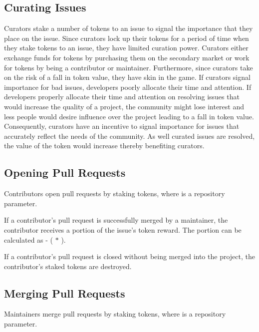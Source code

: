 \subsection{Curating Issues}

Curators stake a number of tokens to an issue to signal the importance that they
place on the issue. Since curators lock up their tokens for a period of time
when they stake tokens to an issue, they have limited curation power. Curators either exchange funds for tokens by purchasing them
on the secondary market or work for tokens by being a
contributor or maintainer. Furthermore, since curators take on the risk of a
fall in token value, they have skin in the game\cite{skininthegame}. If curators
signal importance for bad issues, developers poorly allocate their time and
attention. If developers properly allocate their time and attention on resolving
issues that would increase the quality of a project, the community might lose
interest and less people would desire influence over the project leading to a
fall in token value. Consequently, curators have an incentive to signal
importance for issues that accurately reflect the needs of the community. As
well curated issues are resolved, the value of the token would increase thereby
benefiting curators.

\subsection{Opening Pull Requests}

Contributors open pull requests by staking  tokens,
where  is a repository parameter.

If a contributor's pull request is successfully merged by a maintainer, the
contributor receives a portion of the issue's token reward. The portion can be
calculated as  - ( $*$ ).

If a contributor's pull request is closed without being merged into the project,
the contributor's  staked tokens are destroyed.

\subsection{Merging Pull Requests}
\label{sec:merge}

Maintainers merge pull requests by staking  tokens,
where  is a repository parameter.


